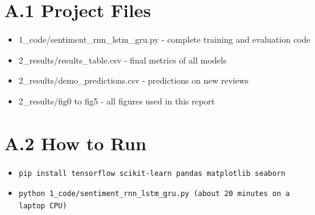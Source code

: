 \documentclass[12pt,a4paper,oneside]{report}
\begin{document}
\section*{A.1 Project Files}
\begin{itemize}
\item 1\_code/sentiment\_rnn\_lstm\_gru.py - complete training and evaluation code
\item 2\_results/results\_table.csv - final metrics of all models
\item 2\_results/demo\_predictions.csv - predictions on new reviews
\item 2\_results/fig0 to fig5 - all figures used in this report
\end{itemize}
\section*{A.2 How to Run}
\begin{itemize}
\item \texttt{pip install tensorflow scikit-learn pandas matplotlib seaborn}
\item \texttt{python 1\_code/sentiment\_rnn\_lstm\_gru.py  (about 20 minutes on a laptop CPU)}
\end{itemize}
\end{document}

